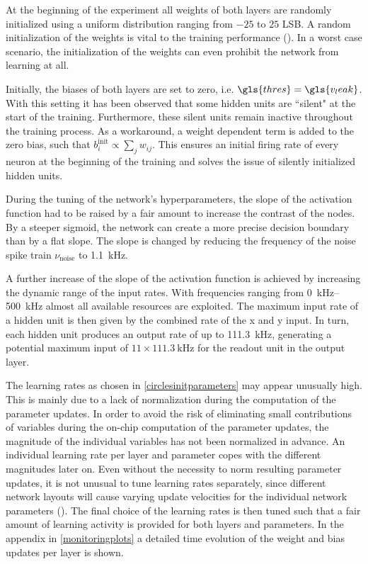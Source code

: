 At the beginning of the experiment all weights of both layers are randomly initialized using a uniform distribution ranging from $-25$ to $25$ LSB. A random initialization of the weights is vital to the training performance (\citealp{Goodfellow-et-al-2016}). In a worst case scenario, the initialization of the weights can even prohibit the network from learning at all.

Initially, the biases of both layers are set to zero, i.e. $\gls{thres} = \gls{v_leak}$. With this setting it has been observed that some hidden units are ``silent" at the start of the training. Furthermore, these silent units remain inactive throughout the training process. As a workaround, a weight dependent term is added to the zero bias, such that $b_i^\text{init} \propto \sum_j w_{ij}$. This ensures an initial firing rate of every neuron at the beginning of the training and solves the issue of silently initialized hidden units.

During the tuning of the network's hyperparameters, the slope of the activation function had to be raised by a fair amount to increase the contrast of the nodes. By a steeper sigmoid, the network can create a more precise decision boundary than by a flat slope. The slope is changed by reducing the frequency of the noise spike train $\nu_\text{noise}$ to \SI{1.1}{\kilo \Hz}. %

A further increase of the slope of the activation function is achieved by increasing the dynamic range of the input rates. With frequencies ranging from \SIrange{0}{500}{\kilo \Hz} almost all available resources are exploited. The maximum input rate of a hidden unit is then given by the combined rate of the x and y input. In turn, each hidden unit produces an output rate of up to \SI{111.3}{\kilo \Hz}, generating a potential maximum input of $11 \times \SI{111.3}{\kilo \Hz}$ for the readout unit in the output layer.

The learning rates as chosen in \cref{circlesinitparameters} may appear unusually high. This is mainly due to a lack of normalization during the computation of the parameter updates. In order to avoid the risk of eliminating small contributions of variables during the on-chip computation of the parameter updates, the magnitude of the individual variables has not been normalized in advance. An individual learning rate per layer and parameter copes with the different magnitudes later on. Even without the necessity to norm resulting parameter updates, it is not unusual to tune learning rates separately, since different network layouts will cause varying update velocities for the individual network parameters (\citealp{Goodfellow-et-al-2016}). The final choice of the learning rates is then tuned such that a fair amount of learning activity is provided for both layers and parameters. In the appendix in \cref{monitoringplots} a detailed time evolution of the weight and bias updates per layer is shown.

